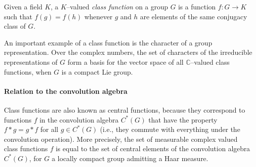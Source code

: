 \documentclass{article}
\newcommand{\C}{\mathbb{C}}
\begin{document}
Given a field $K$, a $K$--valued {\em class function} on a group $G$ is a function $f: G \longrightarrow K$ such that $f(g) = f(h)$ whenever $g$ and $h$ are elements of the same conjugacy class of $G$.

An important example of a class function is the character of a group representation. Over the complex numbers, the set of characters of the irreducible representations of $G$ form a basis for the vector space of all $\C$--valued class functions, when $G$ is a compact Lie group.

\paragraph{Relation to the convolution algebra}

Class functions are also known as central functions, because they correspond to functions $f$ in the convolution algebra $C^*(G)$ that have the property $f*g = g*f$ for all $g \in C^*(G)$ (i.e., they commute with everything under the convolution operation).  More precisely, the set of measurable complex valued class functions $f$ is equal to the set of central elements of the convolution algebra $C^*(G)$, for $G$ a locally compact group admitting a Haar measure.
\end{document}
